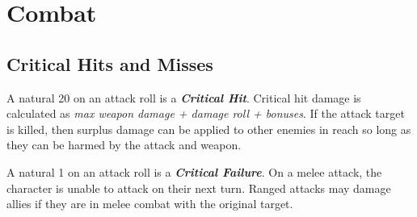 \section{Combat}
\subsection{Critical Hits and Misses}
A natural 20 on an attack roll is a \emph{\textbf{Critical Hit}}. Critical hit
damage is calculated as \emph{max weapon damage + damage roll + bonuses}. If
the attack target is killed, then surplus damage can be applied to other
enemies in reach so long as they can be harmed by the attack and weapon.

A natural 1 on an attack roll is a \emph{\textbf{Critical Failure}}. On a melee
attack, the character is unable to attack on their next turn. Ranged attacks
may damage allies if they are in melee combat with the original target.